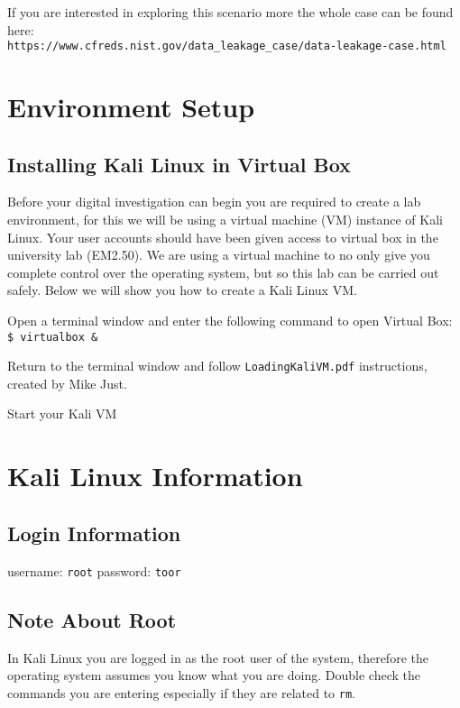 \documentclass[a4paper,11pt]{article}
\begin{document}
 If you are interested in exploring this scenario more the whole case can be found here:\\
 \verb|https://www.cfreds.nist.gov/data_leakage_case/data-leakage-case.html|

\section{Environment Setup}
\subsection*{Installing Kali Linux in Virtual Box}
Before your digital investigation can begin you are required to create a lab environment, for this we will be using a virtual machine (VM) instance of Kali Linux.
Your user accounts should have been given access to virtual box in the university lab (EM2.50). We are using a virtual machine to no only give you complete control over the operating system, but so this lab can be carried out safely. Below we will show you how to create a Kali Linux VM.
	\begin{enumerate*}
	 \item Open a terminal window and enter the following command to open Virtual Box:\\
		\texttt{{\$}	virtualbox {\&}}
	\item Return to the terminal window and follow \texttt{LoadingKaliVM.pdf} instructions, created by Mike Just.
	\item Start your Kali VM
	\end{enumerate*}
	
\section{Kali Linux Information}
\subsection*{Login Information}
	 username: \texttt{root}
	 password: \texttt{toor}

\subsection*{Note About Root}
In Kali Linux you are logged in as the root user of the system, therefore the operating system assumes you know what you are doing. Double check the commands you are entering especially if they are related to \texttt{rm}.
\end{document}
